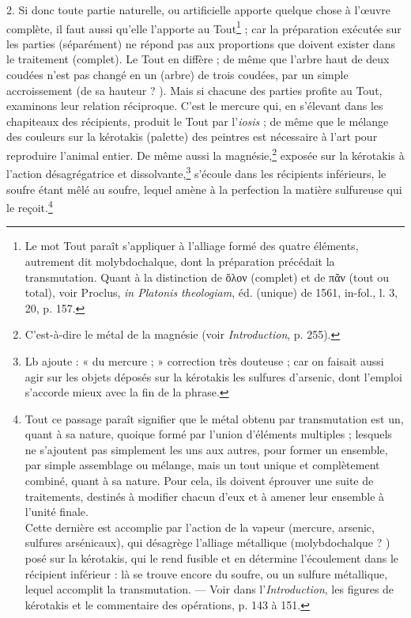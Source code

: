 \documentclass[a4paper, 11pt, oneside, polutonikogreek, french]{article}
\begin{document}
2. Si donc toute partie naturelle, ou artificielle apporte quelque chose à l'œuvre complète, il faut aussi qu'elle l'apporte au Tout\footnote{Le mot Tout paraît s'appliquer à l'alliage formé des quatre éléments, autrement dit molybdochalque, dont la préparation précédait la transmutation. Quant à la distinction de ὅλον (complet) et de πᾶν (tout ou total), voir Proclus, \emph{in Platonis theologiam}, éd. (unique) de 1561, in-fol., l. 3, 20, p. 157.} ; car la préparation exécutée sur les parties (séparément) ne répond pas aux proportions que doivent exister dans le traitement (complet). Le Tout en diffère ; de même que l'arbre haut de deux coudées n'est pas changé en un (arbre) de trois coudées, par un simple accroissement (de sa hauteur ? ). Mais si chacune des parties profite au Tout, examinons leur relation réciproque. C'est le mercure qui, en s'élevant dans les chapiteaux des récipients, produit le Tout par l'\emph{iosis} ; de même que le mélange des couleurs sur la kérotakis (palette) des peintres est nécessaire à l'art pour reproduire l'animal entier. De même aussi la magnésie,\footnote{C'est-à-dire le métal de la magnésie (voir \emph{Introduction}, p. 255).} exposée sur la kérotakis à l'action désagrégatrice et dissolvante,\footnote{Lb ajoute : « du mercure ; » correction très douteuse ; car on faisait aussi agir sur les objets déposés sur la kérotakis les sulfures d'arsenic, dont l'emploi s'accorde mieux avec la fin de la phrase.} s'écoule dans les récipients inférieurs, le soufre étant mêlé au soufre, lequel amène à la perfection la matière sulfureuse qui le reçoit.\footnote{Tout ce passage paraît signifier que le métal obtenu par transmutation est un, quant à sa nature, quoique formé par l'union d'éléments multiples ; lesquels ne s'ajoutent pas simplement les uns aux autres, pour former un ensemble, par simple assemblage ou mélange, mais un tout unique et complètement combiné, quant à sa nature. Pour cela, ils doivent éprouver une suite de traitements, destinés à modifier chacun d'eux et à amener leur ensemble à l'unité finale.\\\hspace*{5mm}Cette dernière est accomplie par l'action de la vapeur (mercure, arsenic, sulfures arsénicaux), qui désagrège l'alliage métallique (molybdochalque ? ) posé sur la kérotakis, qui le rend fusible et en détermine l'écoulement dans le récipient inférieur : là se trouve encore du soufre, ou un sulfure métallique, lequel accomplit la transmutation. --- Voir dans l'\emph{Introduction}, les figures de kérotakis et le commentaire des opérations, p. 143 à 151.}
\end{document}
